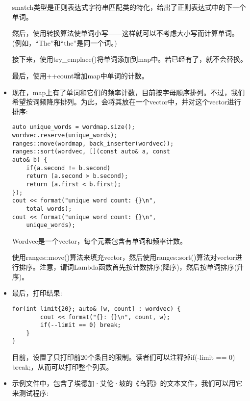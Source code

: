 \begin{itemize}
smatch类型是正则表达式字符串匹配类的特化，给出了正则表达式中的下一个单词。

然后，使用转换算法使单词小写——这样就可以不考虑大小写而计算单词。(例如，“The”和“the”是同一个词。)

接下来，使用try\_emplace()将单词添加到map中。若已经有了，就不会替换。

最后，使用++count增加map中单词的计数。

\item 
现在，map上有了单词和它们的频率计数，目前按字母顺序排列。不过，我们希望按词频降序排列。为此，会将其放在一个vector中，并对这个vector进行排序:

\begin{lstlisting}[style=styleCXX]
auto unique_words = wordmap.size();
wordvec.reserve(unique_words);
ranges::move(wordmap, back_inserter(wordvec));
ranges::sort(wordvec, [](const auto& a, const
auto& b) {
	if(a.second != b.second)
	return (a.second > b.second);
	return (a.first < b.first);
});
cout << format("unique word count: {}\n",
	total_words);
cout << format("unique word count: {}\n",
	unique_words);
\end{lstlisting}

Wordvec是一个vector，每个元素包含有单词和频率计数。

使用ranges::move()算法来填充vector，然后使用ranges::sort()算法对vector进行排序。注意，谓词Lambda函数首先按计数排序(降序)，然后按单词排序(升序)。

\item 
最后，打印结果:

\begin{lstlisting}[style=styleCXX]
	for(int limit{20}; auto& [w, count] : wordvec) {
		cout << format("{}: {}\n", count, w);
		if(--limit == 0) break;
	}
}
\end{lstlisting}

目前，设置了只打印前20个条目的限制。读者们可以注释掉if(-limit == 0) break;，从而可以打印整个列表。

\item 
示例文件中，包含了埃德加·艾伦·坡的《乌鸦》的文本文件，我们可以用它来测试程序:


\end{itemize}

